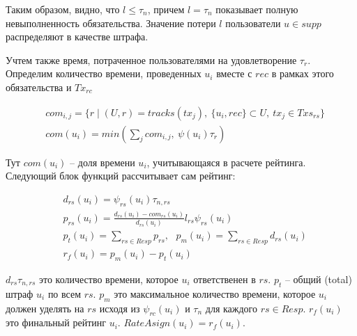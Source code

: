 \documentclass[specification,annotation]{itmo-student-thesis}
\begin{document}
Таким образом, видно, что $l \leq \tau_n$, причем $l = \tau_n$
показывает полную невыполненность обязательства. Значение потери $l$
пользователи $u \in supp$ распределяют в качестве штрафа.

Учтем также время, потраченное пользователями на удовлетворение
$\tau_r$. Определим количество времени, проведенных $u_i$ вместе с
$rec$ в рамках этого обязательства и $Tx_{rc}$

\begin{align*}
  &com_{i,j} = \{r \mid (U,r) = tracks(tx_j),\ \{u_i, rec\} \subset U, \ tx_j \in Txs_{rs}\} \\
  &com(u_i) = min{(\sum_j{com_{i,j}}, \ \psi(u_i) \tau_r)}
\end{align*}

Тут $com(u_i)$ -- доля времени $u_i$, учитывающаяся в расчете рейтинга. Следующий блок функций рассчитывает сам рейтинг:

\begin{align*}
  &d_{rs}(u_i) = \psi_{rs}(u_i)\tau_{n,rs} \\
  &p_{rs}(u_i) = \frac{d_{rs}(u_i) - com_{rs}(u_i)}{d_{rs}(u_i)} l_{rs} \psi_{rs}(u_i) \\
  &p_t(u_i) = \sum_{rs \in Resp}{p_{rs}}, \ \ \ p_m(u_i) = \sum_{rs \in Resp}{d_{rs}(u_i)} \\
  &r_f(u_i) = p_m(u_i) - p_t(u_i)
\end{align*}

$d_{rs}\tau_{n,rs}$ это количество времени, которое $u_i$
ответственен в $rs$. $p_t$ -- общий (total) штраф $u_i$ по всем
$rs$. $p_m$ это максимальное количество времени, которое $u_i$ должен
уделять на $rs$ исходя из $\psi_{rc}(u_i)$ и $\tau_n$ для каждого $rs
\in Resp$. $r_f(u_i)$ это финальный рейтинг $u_i$. $RateAsign(u_i) =
r_f(u_i)$.
\end{document}
